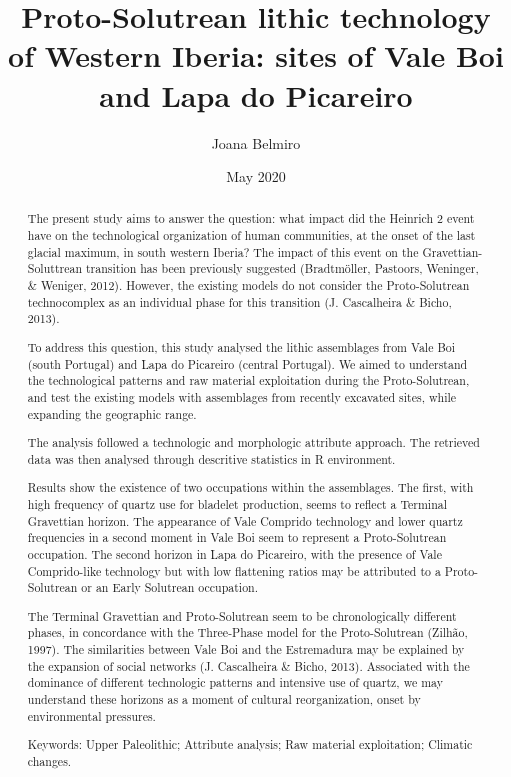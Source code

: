 \documentclass[12pt,twoside]{reedthesis}
\title{Proto-Solutrean lithic technology of Western Iberia: sites of Vale Boi and Lapa do Picareiro}
\author{Joana Belmiro}
\date{May 2020}
\begin{document}
  \maketitle

\frontmatter %


  \begin{abstract}
    The present study aims to answer the question: what impact did the Heinrich 2 event have on the technological organization of human communities, at the onset of the last glacial maximum, in south western Iberia? The impact of this event on the Gravettian-Soluttrean transition has been previously suggested (Bradtmöller, Pastoors, Weninger, \& Weniger, 2012). However, the existing models do not consider the Proto-Solutrean technocomplex as an individual phase for this transition (J. Cascalheira \& Bicho, 2013).
    
    \par
    
    To address this question, this study analysed the lithic assemblages from Vale Boi (south Portugal) and Lapa do Picareiro (central Portugal). We aimed to understand the technological patterns and raw material exploitation during the Proto-Solutrean, and test the existing models with assemblages from recently excavated sites, while expanding the geographic range.
    
    The analysis followed a technologic and morphologic attribute approach. The retrieved data was then analysed through descritive statistics in R environment.
    
    Results show the existence of two occupations within the assemblages. The first, with high frequency of quartz use for bladelet production, seems to reflect a Terminal Gravettian horizon. The appearance of Vale Comprido technology and lower quartz frequencies in a second moment in Vale Boi seem to represent a Proto-Solutrean occupation. The second horizon in Lapa do Picareiro, with the presence of Vale Comprido-like technology but with low flattening ratios may be attributed to a Proto-Solutrean or an Early Solutrean occupation.
    
    The Terminal Gravettian and Proto-Solutrean seem to be chronologically different phases, in concordance with the Three-Phase model for the Proto-Solutrean (Zilhão, 1997). The similarities between Vale Boi and the Estremadura may be explained by the expansion of social networks (J. Cascalheira \& Bicho, 2013). Associated with the dominance of different technologic patterns and intensive use of quartz, we may understand these horizons as a moment of cultural reorganization, onset by environmental pressures.
    
    Keywords: Upper Paleolithic; Attribute analysis; Raw material exploitation; Climatic changes.
  \end{abstract}
\end{document}
